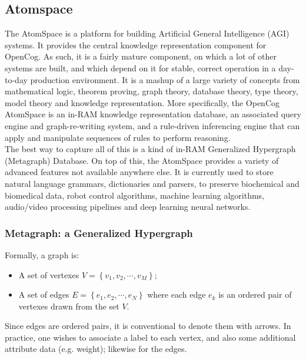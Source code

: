 \subsection{Atomspace}\label{sec:atomspace}

The AtomSpace is a platform for building Artificial General Intelligence (AGI) systems. It provides the central knowledge representation component for OpenCog. As such, it is a fairly mature component, on which a lot of other systems are built, and which depend on it for stable, correct operation in a day-to-day production environment.
It is a mashup of a large variety of concepts from mathematical logic, theorem proving, graph theory, database theory, type theory, model theory and knowledge representation.
More specifically, the OpenCog AtomSpace is an in-RAM knowledge representation database, an associated query engine and graph-re-writing system, and a rule-driven inferencing engine that can apply and manipulate sequences of rules to perform reasoning. \\
The best way to capture all of this is a kind of in-RAM Generalized Hypergraph (Metagraph) Database.
On top of this, the AtomSpace provides a variety of advanced features not available anywhere else. It is currently used to store natural language grammars, dictionaries and parsers, to preserve biochemical and biomedical data, robot control algorithms, machine learning algorithms, audio/video processing pipelines and deep learning neural networks.

\subsubsection{Metagraph: a Generalized Hypergraph}\label{sec:gen_hypergraph}

Formally, a graph is:
\begin{itemize}
	\item A set of vertexes $V=\left\{v_{1}, v_{2}, \cdots, v_{M}\right\}$;
	\item A set of edges $E=\left\{e_{1}, e_{2}, \cdots, e_{N}\right\}$ where each edge $e_{k}$ is an ordered pair of vertexes drawn from the set $V$.
\end{itemize}
Since edges are ordered pairs, it is conventional to denote them with arrows. In practice, one wishes to associate a label to each vertex, and also some additional attribute data (e.g. weight); likewise for the edges. \\

